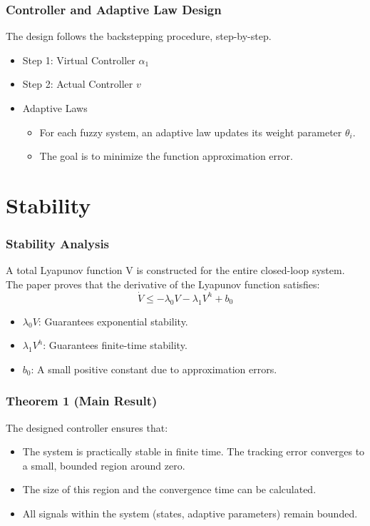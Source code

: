 \documentclass[18p]{beamer}
\begin{document}
 \begin{frame}[noframenumbering]
 	\frametitle{Controller and Adaptive Law Design}
 	The design follows the backstepping procedure, step-by-step.
 	\begin{itemize}
 		\item Step 1: Virtual Controller $\alpha_1$
 		\item Step 2: Actual Controller $v$
 		\item Adaptive Laws
 		 \begin{itemize}
 			\item For each fuzzy system, an adaptive law updates its weight parameter $\theta_i$.
 			\item The goal is to minimize the function approximation error.
 		\end{itemize}
 	\end{itemize}
 \end{frame}
\section{Stability}
\begin{frame}
	\frametitle{Stability Analysis}
A total Lyapunov function V is constructed for the entire closed-loop system.
The paper proves that the derivative of the Lyapunov function satisfies:
\begin{equation*}
	\dot{V} \le -\lambda_0 V - \lambda_1 V^h + b_0
\end{equation*}

\begin{itemize}
	\item $\lambda_0 V$: Guarantees exponential stability.
	\item $\lambda_1 V^h$: Guarantees finite-time stability.
	\item $b_0$: A small positive constant due to approximation errors.
\end{itemize}
\end{frame}
\begin{frame}
	\frametitle{Theorem 1 (Main Result)}
	The designed controller ensures that:
	\begin{itemize}
		\item The system is practically stable in finite time. The tracking error converges to a small, bounded region around zero.
		\item The size of this region and the convergence time can be calculated.
		\item All signals within the system (states, adaptive parameters) remain bounded.
		\end{itemize}
\end{frame}
\end{document}

